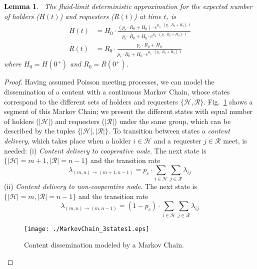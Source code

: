 \documentclass[10pt,conference,letterpaper]{IEEEtran}
\newtheorem{lemma}{Lemma}
\begin{document}
\begin{lemma}~\label{thm:ODEs}
The fluid-limit deterministic approximation for the expected number of holders ($H(t)$) and requesters ($R(t)$) at time $t$, is
\begin{align*}
H(t) &{=}  H_{0}\cdot \frac{(p_{c}\cdot R_{0}+H_{0})\cdot e^{\mu_{\lambda}\cdot(p_{c}\cdot R_{0}+H_{0})\cdot t }}{p_{c}\cdot R_{0}+H_{0}\cdot e^{\mu_{\lambda}\cdot(p_{c}\cdot R_{0}+H_{0})\cdot t }}\\
R(t) &{=} R_{0}\cdot \frac{p_{c}\cdot R_{0}+H_{0}}{p_{c}\cdot R_{0}+H_{0}\cdot e^{\mu_{\lambda}\cdot(p_{c}\cdot R_{0}+H_{0})\cdot t }} 
\end{align*}
where $H_{0} = H(0^{+})$ and $R_{0} = R(0^{+})$.
\end{lemma}
\begin{proof} Having assumed Poisson meeting processes, we can model the dissemination of a content with a continuous Markov Chain, whose states correspond to the different sets of holders and requesters $\{\mathcal{H},\mathcal{R}\}$. Fig.~\ref{fig:markov-chain} shows a segment of this Markov Chain; we present the different states with equal number of holders ($|\mathcal{H}|$) and requesters ($|\mathcal{R}|$) under the same group, which can be described by the tuples $\{|\mathcal{H}|,|\mathcal{R}|\}$. To transition between states a \textit{content delivery}, which takes place when a holder $i\in\mathcal{H}$ and a requester $j\in\mathcal{R}$ meet, is needed:
(i) \textit{Content delivery to cooperative node.} The next state is $\{|\mathcal{H}|=m+1,|\mathcal{R}|=n-1\}$ and the transition rate
\begin{equation}\label{eq:transition-rate-pc-generic}
 \lambda_{(m,n)\rightarrow(m+1,n-1)} = p_{c}\cdot \textstyle\sum_{i\in\mathcal{H}}\sum_{j\in\mathcal{R}}\lambda_{ij}
\end{equation}
(ii) \textit{Content delivery to non-cooperative node.} The next state is $\{|\mathcal{H}|=m,|\mathcal{R}|=n-1\}$ and the transition rate
\begin{equation}\label{eq:transition-rate-1-pc-generic}
 \lambda_{(m,n)\rightarrow(m,n-1)} = (1-p_{c})\cdot \textstyle\sum_{i\in\mathcal{H}}\sum_{j\in\mathcal{R}}\lambda_{ij}
\end{equation}

\begin{figure}
\texttt{[image: ./MarkovChain\_3states1.eps]}\caption{Content dissemination modeled by a Markov Chain.}
\label{fig:markov-chain}
\end{figure}




\end{proof}
\end{document}
